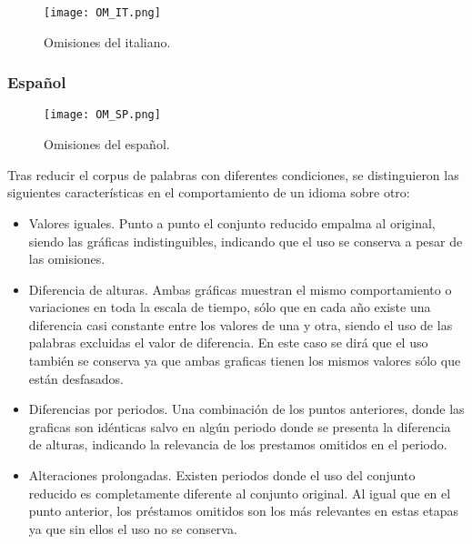 \begin{figure}[h!]
	\centering
	\texttt{[image: OM\_IT.png]}
	\label{fig.OM_IT}
	\caption{Omisiones del italiano.}
\end{figure}

\newpage
\subsubsection*{Español}

\begin{figure}[h!]
	\centering
	\texttt{[image: OM\_SP.png]}
	\label{fig.OM_SP}
	\caption{Omisiones del español.}
\end{figure}


Tras reducir el corpus de palabras con diferentes condiciones, se distinguieron las siguientes características en el comportamiento de un idioma sobre otro:


\begin{itemize}
	
	\item Valores iguales. Punto a punto el conjunto reducido empalma al original, siendo las gráficas indistinguibles, indicando que el uso se conserva a pesar de las omisiones. 
		
	\item Diferencia de alturas. Ambas gráficas muestran el mismo comportamiento o variaciones en toda la escala de tiempo,  sólo que  en cada año existe una diferencia casi constante entre los valores de una y otra, siendo el uso de las palabras excluidas el valor de diferencia.  En este caso se dirá que el uso también se conserva ya que ambas graficas tienen los mismos valores sólo que están desfasados. 
	
	\item Diferencias por periodos. Una combinación de los puntos anteriores,  donde las graficas son idénticas salvo en algún periodo donde se presenta la diferencia de alturas, indicando la relevancia de los prestamos omitidos en el periodo. 
	
	\item Alteraciones prolongadas. Existen periodos donde el uso del conjunto reducido es completamente diferente al conjunto original. Al igual que en el punto anterior, los préstamos omitidos son los más relevantes en estas etapas ya que sin ellos el uso no se conserva.
			
\end{itemize}


